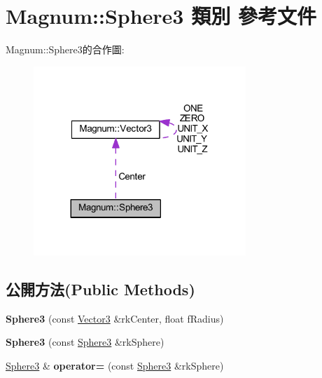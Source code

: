 \hypertarget{class_magnum_1_1_sphere3}{}\section{Magnum\+:\+:Sphere3 類別 參考文件}
\label{class_magnum_1_1_sphere3}


Magnum\+:\+:Sphere3的合作圖\+:\nopagebreak
\begin{figure}[H]
\begin{center}
\leavevmode
\includegraphics[width=227pt]{class_magnum_1_1_sphere3__coll__graph}
\end{center}
\end{figure}
\subsection*{公開方法(Public Methods)}
\begin{DoxyCompactItemize}
\item 
{\bfseries Sphere3} (const \hyperlink{class_magnum_1_1_vector3}{Vector3} \&rk\+Center, float f\+Radius)\hypertarget{class_magnum_1_1_sphere3_a79c6676989abc7567c5f70ec5acdf6be}{}\label{class_magnum_1_1_sphere3_a79c6676989abc7567c5f70ec5acdf6be}

\item 
{\bfseries Sphere3} (const \hyperlink{class_magnum_1_1_sphere3}{Sphere3} \&rk\+Sphere)\hypertarget{class_magnum_1_1_sphere3_acb350acfbfeaa615afa62bef9b594321}{}\label{class_magnum_1_1_sphere3_acb350acfbfeaa615afa62bef9b594321}

\item 
\hyperlink{class_magnum_1_1_sphere3}{Sphere3} \& {\bfseries operator=} (const \hyperlink{class_magnum_1_1_sphere3}{Sphere3} \&rk\+Sphere)\hypertarget{class_magnum_1_1_sphere3_a0ee7373aee88a6b1388c3a444668b56f}{}\label{class_magnum_1_1_sphere3_a0ee7373aee88a6b1388c3a444668b56f}

\end{DoxyCompactItemize}
